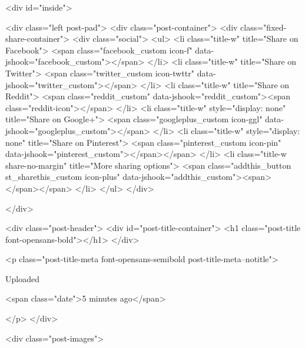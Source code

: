     

        <div id="inside">
        
        <div class="left post-pad">
            <div class="post-container">
                <div class="fixed-share-container">
                    <div class="social">
    <ul>
        <li class="title-w" title="Share on Facebook">
            <span class="facebook_custom icon-f" data-jshook="facebook_custom"></span>
        </li>
        <li class="title-w" title="Share on Twitter">
            <span class="twitter_custom icon-twttr" data-jshook="twitter_custom"></span>
        </li>
        <li class="title-w" title="Share on Reddit">
            <span class="reddit_custom" data-jshook="reddit_custom"><span class="reddit-icon"></span>
        </li>
        <li class="title-w" style="display: none" title="Share on Google+">
            <span class="googleplus_custom icon-ggl" data-jshook="googleplus_custom"></span>
        </li>
        <li class="title-w" style="display: none" title="Share on Pinterest">
            <span class="pinterest_custom icon-pin" data-jshook="pinterest_custom"></span></span>
        </li>
        <li class="title-w share-no-margin" title="More sharing options">
            <span class="addthis_button st_sharethis_custom icon-plus" data-jshook="addthis_custom"><span></span></span>
        </li>
    </ul>
</div>

                </div>

                <div class="post-header">
                    <div id="post-title-container">
                        <h1 class="post-title font-opensans-bold"></h1>
                    </div>

                    <p class="post-title-meta font-opensans-semibold post-title-meta--notitle">
                        

                        
                                                    
                            Uploaded
                        

                                                    <span class="date">5 minutes ago</span>
                        

                        
                        
                    </p>
                </div>

                <div class="post-images">

                                    
                    

